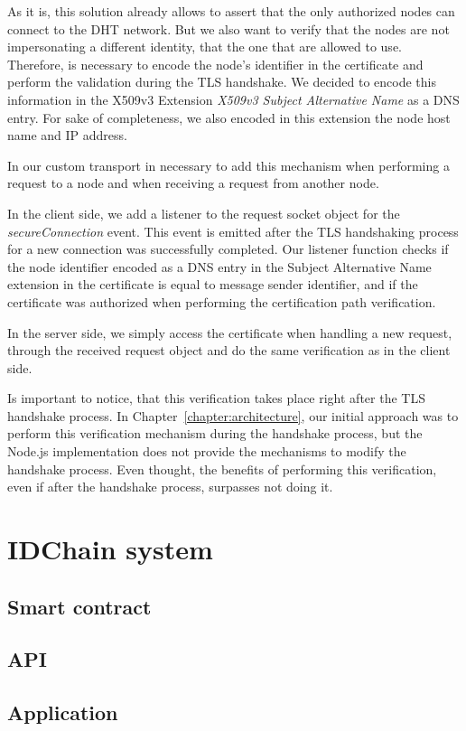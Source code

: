 

As it is, this solution already allows to assert that the only authorized nodes can connect to the DHT network.
But we also want to verify that the nodes are not impersonating a different identity, that the one that are allowed to use.
Therefore, is necessary to encode the node's identifier in the certificate and perform the validation during the TLS handshake.
We decided to encode this information in the X509v3 Extension \textit{X509v3 Subject Alternative Name} as a DNS entry.
For sake of completeness, we also encoded in this extension the node host name and IP address.

In our custom transport in necessary to add this mechanism when performing a request to a node and when receiving a request from another node.

In the client side, we add a listener to the request socket object for the \textit{secureConnection} event.
This event is emitted after the TLS handshaking process for a new connection was successfully completed.
Our listener function checks if the node identifier encoded as a DNS entry in the Subject Alternative Name extension in the certificate is equal to message sender identifier, and if the certificate was authorized when performing the certification path verification.


In the server side, we simply access the certificate when handling a new request, through the received request object and do the same verification as in the client side.

Is important to notice, that this verification takes place right after the TLS handshake process.
In Chapter~\ref{chapter:architecture}, our initial approach was to perform this verification mechanism during the handshake process, but the Node.js implementation does not provide the mechanisms to modify the handshake process.
Even thought, the benefits of performing this verification, even if after the handshake process, surpasses not doing it.

\section{IDChain system}\label{implementation:idchain}

\subsection{Smart contract}

\subsection{API}

\subsection{Application}
